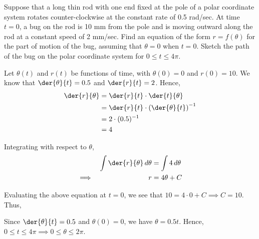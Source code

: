 \documentclass{jhwhw}
\begin{document}
    \problem{}
        Suppose that a long thin rod with one end fixed at the pole of a polar coordinate system rotates counter-clockwise at the constant rate of 0.5 rad/sec. At time $t = 0$, a bug on the rod is 10 mm from the pole and is moving outward along the rod at a constant speed of 2 mm/sec. Find an equation of the form $r = f(\theta)$ for the part of motion of the bug, assuming that $\theta = 0$ when $t = 0$. Sketch the path of the bug on the polar coordinate system for $0 \leq t \leq 4\pi$.

    \solution
        Let $\theta(t)$ and $r(t)$ be functions of time, with $\theta(0) = 0$ and $r(0) = 10$. We know that $\der{\theta}{t} = 0.5$ and $\der{r}{t} = 2$. Hence,
        \begin{align*}
            \der{r}{\theta} &= \der{r}{t} \cdot \der{t}{\theta} \\
            &= \der{r}{t} \cdot \left(\der{\theta}{t}\right)^{-1}\\
            &= 2 \cdot (0.5)^{-1}\\
            &= 4
        \end{align*}

        Integrating with respect to $\theta$,
        \begin{alignat*}{2}
            &&\int \der{r}{\theta}\, d\theta &= \int 4 \, d\theta\\
            \implies&&r &= 4\theta + C
        \end{alignat*}

        Evaluating the above equation at $t=0$, we see that $10 = 4\cdot 0 + C \implies C = 10$. Thus,


        Since $\der{\theta}{t} = 0.5$ and $\theta(0) = 0$, we have $\theta = 0.5t$. Hence, $0 \leq t \leq 4\pi \implies 0 \leq \theta \leq 2\pi$.
\end{document}
